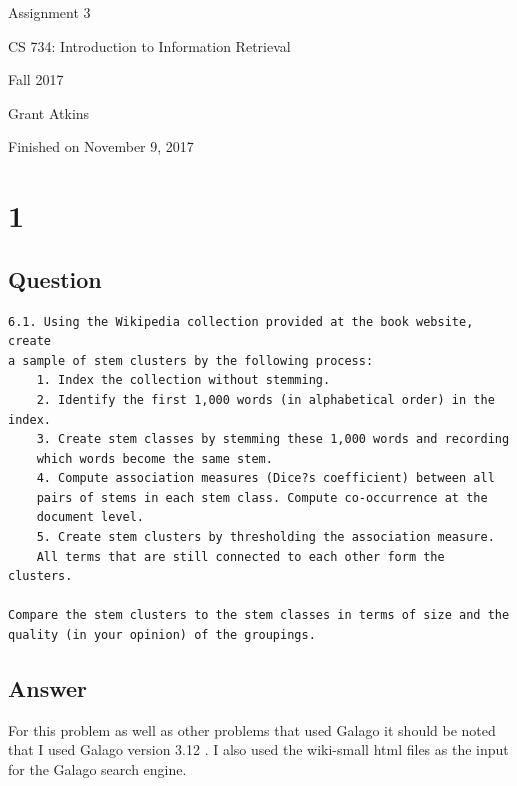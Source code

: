 \documentclass[letterpaper,11pt]{article}
\begin{document}
\begin{titlepage}

\begin{center}

\Huge{Assignment 3}

\Large{CS 734:  Introduction to Information Retrieval}

\Large{Fall 2017}

\Large{Grant Atkins}

\Large Finished on November 9, 2017

\end{center}

\end{titlepage}

\newpage


\section*{1}

\subsection*{Question}

\begin{verbatim}
6.1. Using the Wikipedia collection provided at the book website, create 
a sample of stem clusters by the following process:
    1. Index the collection without stemming.
    2. Identify the first 1,000 words (in alphabetical order) in the index.
    3. Create stem classes by stemming these 1,000 words and recording 
    which words become the same stem.
    4. Compute association measures (Dice?s coefficient) between all 
    pairs of stems in each stem class. Compute co-occurrence at the 
    document level.
    5. Create stem clusters by thresholding the association measure. 
    All terms that are still connected to each other form the clusters.

Compare the stem clusters to the stem classes in terms of size and the 
quality (in your opinion) of the groupings.
\end{verbatim}

\subsection*{Answer}

For this problem as well as other problems that used Galago it should be noted that I used Galago version 3.12 \cite{galago}. 
I also used the wiki-small html files as the input for the Galago search engine.
\end{document}
